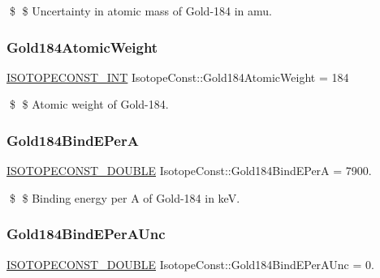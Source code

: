 \$ \$ Uncertainty in atomic mass of Gold-\/184 in amu. \mbox{\label{group___isotope_const-_gold-_au184_gaec4ff2a824c545744c2e829893c8fcb2}} 
\subsubsection{\texorpdfstring{Gold184\+Atomic\+Weight}{Gold184AtomicWeight}}
{\footnotesize\ttfamily \mbox{\hyperlink{group___isotope_const-_macros_ga5f18360b3e99483a35c32d789e62621c}{I\+S\+O\+T\+O\+P\+E\+C\+O\+N\+S\+T\+\_\+\+I\+NT}} Isotope\+Const\+::\+Gold184\+Atomic\+Weight = 184}

\$ \$ Atomic weight of Gold-\/184. \mbox{\label{group___isotope_const-_gold-_au184_ga456ad87a20bae483ec4563655048933d}} 
\subsubsection{\texorpdfstring{Gold184\+Bind\+E\+PerA}{Gold184BindEPerA}}
{\footnotesize\ttfamily \mbox{\hyperlink{group___isotope_const-_macros_ga8f45a7272ce02c0b4c65c44636ed719a}{I\+S\+O\+T\+O\+P\+E\+C\+O\+N\+S\+T\+\_\+\+D\+O\+U\+B\+LE}} Isotope\+Const\+::\+Gold184\+Bind\+E\+PerA = 7900.}

\$ \$ Binding energy per A of Gold-\/184 in keV. \mbox{\label{group___isotope_const-_gold-_au184_gad727a7a0f7992e190b949532012945fc}} 
\subsubsection{\texorpdfstring{Gold184\+Bind\+E\+Per\+A\+Unc}{Gold184BindEPerAUnc}}
{\footnotesize\ttfamily \mbox{\hyperlink{group___isotope_const-_macros_ga8f45a7272ce02c0b4c65c44636ed719a}{I\+S\+O\+T\+O\+P\+E\+C\+O\+N\+S\+T\+\_\+\+D\+O\+U\+B\+LE}} Isotope\+Const\+::\+Gold184\+Bind\+E\+Per\+A\+Unc = 0.}

